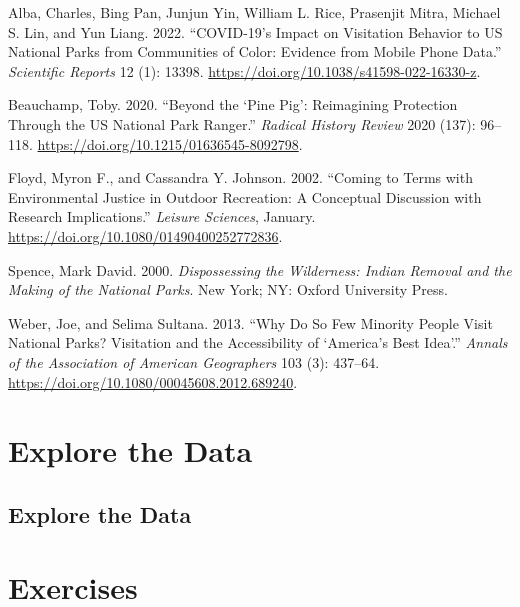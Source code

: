 \documentclass[
  letterpaper,
  DIV=11,
  numbers=noendperiod]{scrartcl}
\newlength{\cslhangindent}
\newenvironment{CSLReferences}[2] %
 {\begin{list}{}{%
  \setlength{\itemindent}{0pt}
  \setlength{\leftmargin}{0pt}
  \setlength{\parsep}{0pt}
  \ifodd #1
   \setlength{\leftmargin}{\cslhangindent}
   \setlength{\itemindent}{-1\cslhangindent}
  \fi
  \setlength{\itemsep}{#2\baselineskip}}}
 {\end{list}}
\begin{document}
\label{refs}
\begin{CSLReferences}{1}{0}
Alba, Charles, Bing Pan, Junjun Yin, William L. Rice, Prasenjit Mitra,
Michael S. Lin, and Yun Liang. 2022. {``{COVID}-19's Impact on
Visitation Behavior to {US} National Parks from Communities of Color:
Evidence from Mobile Phone Data.''} \emph{Scientific Reports} 12 (1):
13398. \url{https://doi.org/10.1038/s41598-022-16330-z}.

Beauchamp, Toby. 2020. {``Beyond the {`{Pine} {Pig}'}: {Reimagining}
{Protection} Through the {US} {National} {Park} {Ranger}.''}
\emph{Radical History Review} 2020 (137): 96--118.
\url{https://doi.org/10.1215/01636545-8092798}.

Floyd, Myron F., and Cassandra Y. Johnson. 2002. {``Coming to {Terms}
with {Environmental} {Justice} in {Outdoor} {Recreation}: {A}
{Conceptual} {Discussion} with {Research} {Implications}.''}
\emph{Leisure Sciences}, January.
\url{https://doi.org/10.1080/01490400252772836}.

Spence, Mark David. 2000. \emph{Dispossessing the {Wilderness}: {Indian}
{Removal} and the {Making} of the {National} {Parks}}. New York; NY:
Oxford University Press.

Weber, Joe, and Selima Sultana. 2013. {``Why {Do} {So} {Few} {Minority}
{People} {Visit} {National} {Parks}? {Visitation} and the
{Accessibility} of {`{America}'s {Best} {Idea}'}.''} \emph{Annals of the
Association of American Geographers} 103 (3): 437--64.
\url{https://doi.org/10.1080/00045608.2012.689240}.

\end{CSLReferences}

\label{custom-footnotes}

\section{Explore the Data}

\subsection{Explore the Data}\label{explore-the-data}

\section{Exercises}
\end{document}

